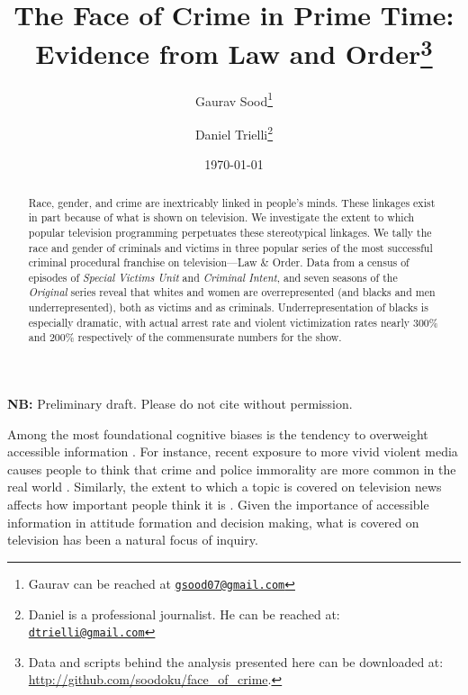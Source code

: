 \documentclass[12pt, letterpaper]{article}
\title{\Large{The Face of Crime in Prime Time:\\ Evidence from Law and Order}\footnote{Data and scripts behind the analysis presented here can be downloaded at: \url{http://github.com/soodoku/face_of_crime}.}}
\author{Gaurav Sood\thanks{Gaurav can be reached at \href{mailto:gsood07@gmail.com}{\footnotesize{\texttt{gsood07@gmail.com}}}} \and Daniel Trielli\thanks{Daniel is a professional journalist. He can be reached at: \href{mailto:dtrielli@gmail.com}{\footnotesize{\texttt{dtrielli@gmail.com}}}}\vspace{.5cm}}
\date{\vspace{.5cm}\normalsize{\today}}
\begin{document}
\maketitle

\begin{center}
\vspace{.5cm}\textbf{NB:} Preliminary draft. Please do not cite without permission.\vspace{1.5cm}
\end{center}

\begin{abstract}
\noindent Race, gender, and crime are inextricably linked in people's minds. These linkages exist in part because of what is shown on television. We investigate the extent to which popular television programming perpetuates these stereotypical linkages. We tally the race and gender of criminals and victims in three popular series of the most successful criminal procedural franchise on television---Law \& Order. Data from a census of episodes of \textit{Special Victims Unit} and \textit{Criminal Intent}, and seven seasons of the \textit{Original} series reveal that whites and women are overrepresented (and blacks and men underrepresented), both as victims and as criminals. Underrepresentation of blacks is especially dramatic, with actual arrest rate and violent victimization rates nearly 300\% and 200\% respectively of the commensurate numbers for the show. 
\end{abstract}
\clearpage
\doublespace

Among the most foundational cognitive biases is the tendency to overweight accessible information \citep{tversky1973availability}. For instance, recent exposure to more vivid violent media causes people to think that crime and police immorality are more common in the real world \citep{riddle2010always}. Similarly, the extent to which a topic is covered on television news affects how important people think it is \citep{mccombs1972agenda, iyengar2010news, iyengar1990accessibility}. Given the importance of accessible information in attitude formation and decision making, what is covered on television has been a natural focus of inquiry. 
\end{document}
